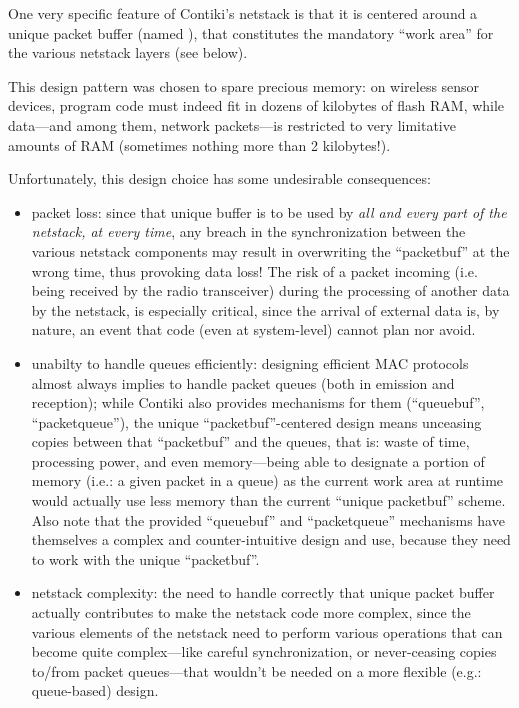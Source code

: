 \documentclass[12pt,twoside,a4paper]{article}
\begin{document}
One very specific feature of Contiki's netstack is that it is centered
around a unique packet buffer (named ), that constitutes
the mandatory ``work area'' for the various netstack layers (see below).

This design pattern was chosen to spare precious memory: on wireless sensor
devices, program code must indeed fit in dozens of kilobytes of flash RAM,
while data---and among them, network packets---is restricted to very
limitative amounts of RAM (sometimes nothing more than 2 kilobytes!).

Unfortunately, this design choice has some undesirable consequences:
\begin{itemize}
\item packet loss: since that unique buffer is to be used by \emph{all
      and every part of the netstack, at every time}, any breach in
      the synchronization between the various netstack components
      may result in overwriting the ``packetbuf'' at the wrong time,
      thus provoking data loss! The risk of a packet incoming (i.e. being
      received by the radio transceiver) during the processing of another
      data by the netstack, is especially critical, since the arrival of
      external data is, by nature, an event that code (even at
      system-level) cannot plan nor avoid.
\item unabilty to handle queues efficiently: designing efficient MAC protocols
      almost always implies to handle packet queues (both in emission and
      reception); while Contiki also provides mechanisms for them
      (``queuebuf'', ``packetqueue''), the unique ``packetbuf''-centered
      design means unceasing copies between that ``packetbuf'' and the queues,
      that is: waste of time, processing power, and even memory---being
      able to designate a portion of memory (i.e.: a given packet in a
      queue) as the current work area at runtime would actually use less
      memory than the current ``unique packetbuf'' scheme. Also note that
      the provided ``queuebuf'' and ``packetqueue'' mechanisms have themselves
      a complex and counter-intuitive design and use, because they need to
      work with the unique ``packetbuf''.
\item netstack complexity: the need to handle correctly that unique packet
      buffer actually contributes to make the netstack code more complex,
      since the various elements of the netstack need to perform various
      operations that can become quite complex---like careful synchronization,
      or never-ceasing copies to/from packet queues---that wouldn't be
      needed on a more flexible (e.g.: queue-based) design.
\end{itemize}
\end{document}

